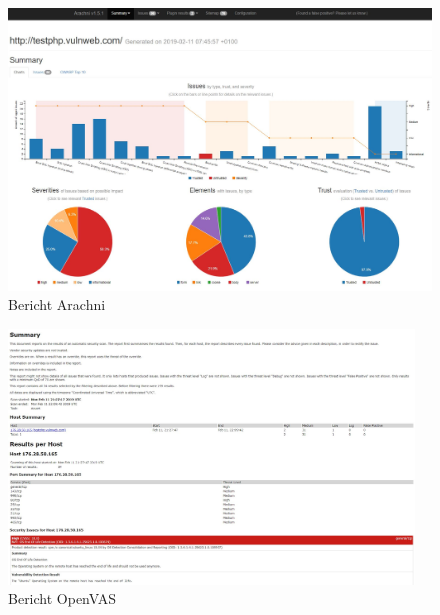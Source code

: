 \documentclass[12pt,oneside,a4paper,parskip,pointlessnumbers]{scrbook}
\begin{document}
  \begin{figure}[htb!]
    \centering
      \includegraphics[width=1\textwidth]{Images/ScrArachni}
    \caption[Bericht Arachni]{Bericht Arachni}
  \end{figure}
  \begin{figure}[htb!]
    \centering
      \includegraphics[width=0.96\textwidth]{Images/ScrOpenVAS}
    \caption[Bericht OpenVAS]{Bericht OpenVAS}
  \end{figure}
\end{document}
